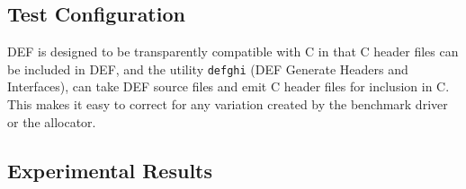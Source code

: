 \subsection{Test Configuration}

DEF is designed to be transparently compatible with C in that C header files can be included in DEF, and the utility \texttt{defghi} (DEF Generate Headers and Interfaces), can take DEF source files and emit C header files for inclusion in C.  This makes it easy to correct for any variation created by the benchmark driver or the allocator.

\subsection{Experimental Results}
